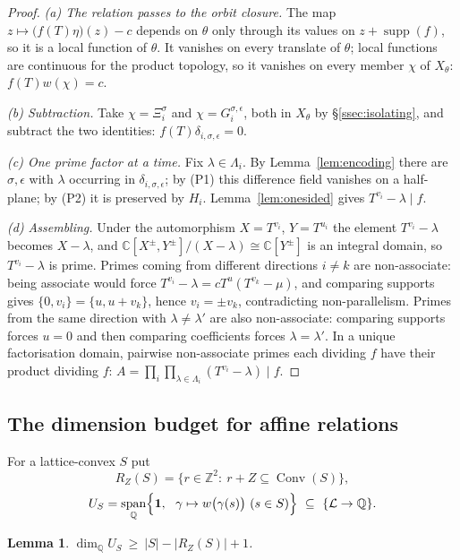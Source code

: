 \documentclass[11pt,reqno]{amsart}
\theoremstyle{plain}
\newtheorem{lem}[thm]{Lemma}
\theoremstyle{definition}
\theoremstyle{remark}
\theoremstyle{plain}
\theoremstyle{remark}
\theoremstyle{definition}
\numberwithin{equation}{section}
\DeclareMathOperator{\Conv}{Conv}
\DeclareMathOperator{\supp}{supp}
\DeclareMathOperator{\spn}{span}
\newcommand{\Z}{\mathbb{Z}}
\newcommand{\C}{\mathbb{C}}
\newcommand{\Q}{\mathbb{Q}}
\newcommand{\cL}{\mathcal{L}}
\begin{document}
\begin{proof}
\emph{(a) The relation passes to the orbit closure.}  The map
$z\mapsto\bigl(f(T)\eta\bigr)(z)-c$ depends on $\theta$ only through its values
on $z+\supp(f)$, so it is a local function of $\theta$.  It vanishes on every
translate of $\theta$; local functions are continuous for the product topology,
so it vanishes on every member $\chi$ of $X_\theta$: $f(T)w(\chi)=c$.

\emph{(b) Subtraction.}  Take $\chi=\Xi_i^\sigma$ and $\chi=G_i^{\sigma,\epsilon}$,
both in $X_\theta$ by \S\ref{ssec:isolating}, and subtract the two identities:
$f(T)\delta_{i,\sigma,\epsilon}=0$.

\emph{(c) One prime factor at a time.}  Fix $\lambda\in\Lambda_i$.  By
Lemma~\ref{lem:encoding} there are $\sigma,\epsilon$ with $\lambda$ occurring in
$\delta_{i,\sigma,\epsilon}$; by \textup{(P1)} this difference field vanishes on
a half-plane; by \textup{(P2)} it is preserved by $H_i$.  Lemma~\ref{lem:onesided}
gives $T^{v_i}-\lambda\mid f$.

\emph{(d) Assembling.}  Under the automorphism $X=T^{v_i}$, $Y=T^{u_i}$ the
element $T^{v_i}-\lambda$ becomes $X-\lambda$, and
$\C[X^{\pm},Y^{\pm}]/(X-\lambda)\cong\C[Y^{\pm}]$ is an integral domain, so
$T^{v_i}-\lambda$ is prime.  Primes coming from different directions $i\ne k$
are non-associate: being associate would force
$T^{v_i}-\lambda=cT^u(T^{v_k}-\mu)$, and comparing supports gives
$\{0,v_i\}=\{u,u+v_k\}$, hence $v_i=\pm v_k$, contradicting non-parallelism.
Primes from the same direction with $\lambda\ne\lambda'$ are also
non-associate: comparing supports forces $u=0$ and then comparing coefficients
forces $\lambda=\lambda'$.  In a unique factorisation domain, pairwise
non-associate primes each dividing $f$ have their product dividing $f$:
$A=\prod_i\prod_{\lambda\in\Lambda_i}(T^{v_i}-\lambda)\mid f$.
\end{proof}

\subsection{The dimension budget for affine relations}\label{ssec:budget}

For a lattice-convex $S$ put
\[R_Z(S)=\bigl\{r\in\Z^2:\ r+Z\subseteq\Conv(S)\bigr\},\]
\[U_S=\spn_{\Q}\Bigl\{\mathbf 1,\ \ \gamma\mapsto w\bigl(\gamma(s)\bigr)\ (s\in S)
      \Bigr\}\ \subseteq\ \{\cL\to\Q\}.\]

\begin{lem}\label{lem:budget}
$\dim_{\Q}U_S\ \ge\ |S|-|R_Z(S)|+1$.
\end{lem}
\end{document}
